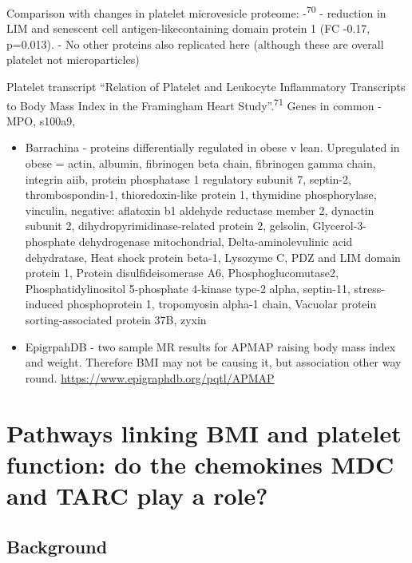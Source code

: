 \documentclass[11pt,twoside]{bristolthesis}
\begin{document}
Comparison with changes in platelet microvesicle proteome:
-\textsuperscript{70}
- reduction in LIM and senescent cell antigen-likecontaining domain protein 1
(FC -0.17, p=0.013).
- No other proteins also replicated here (although these are overall platelet not microparticles)

Platelet transcript ``Relation of Platelet and Leukocyte Inflammatory Transcripts to Body Mass Index in the Framingham Heart Study''.\textsuperscript{71} Genes in common
- MPO, s100a9,
\begin{itemize}
\item
  Barrachina - proteins differentially regulated in obese v lean. Upregulated in obese = actin, albumin, fibrinogen beta chain, fibrinogen gamma chain, integrin aiib, protein phosphatase 1 regulatory subunit 7, septin-2, thrombospondin-1, thioredoxin-like protein 1, thymidine phosphorylase, vinculin, negative: aflatoxin b1 aldehyde reductase member 2, dynactin subunit 2, dihydropyrimidinase-related protein 2, gelsolin, Glycerol-3-phosphate dehydrogenase mitochondrial, Delta-aminolevulinic acid dehydratase, Heat shock protein beta-1, Lysozyme C,
  PDZ and LIM domain protein 1, Protein disulfideisomerase A6, Phosphoglucomutase2, Phosphatidylinositol 5-phosphate 4-kinase type-2 alpha, septin-11, stress-induced phosphoprotein 1, tropomyosin alpha-1 chain, Vacuolar protein sorting-associated protein 37B, zyxin
\item
  EpigrpahDB - two sample MR results for APMAP raising body mass index and weight. Therefore BMI may not be causing it, but association other way round. \url{https://www.epigraphdb.org/pqtl/APMAP}
\end{itemize}
\hypertarget{chemokine-platelets}{%
\chapter{Pathways linking BMI and platelet function: do the chemokines MDC and TARC play a role?}\label{chemokine-platelets}}

\hypertarget{background-3}{%
\section{Background}\label{background-3}}
\end{document}
